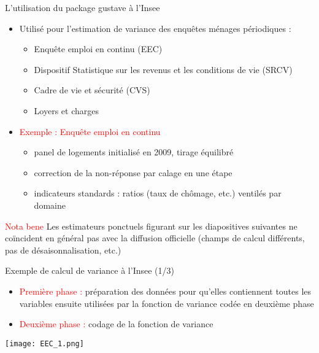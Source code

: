\documentclass[xcolor=dvipsnames]{beamer}
\begin{document}
\begin{frame}{L'utilisation du package gustave à l'Insee}

\begin{itemize}
    \item Utilisé pour l'estimation de variance des enquêtes ménages périodiques : 
    \vspace{0.1 cm}
    \begin{itemize}
        \item Enquête emploi en continu (EEC)
        \item Dispositif Statistique sur les revenus et les conditions de vie (SRCV)
        \item Cadre de vie et sécurité (CVS)
        \item Loyers et charges
    \end{itemize}
    \vspace{0.2 cm}
    \item \textcolor{red}{Exemple : Enquête emploi en continu}
    \vspace{0.1 cm}
    \begin{itemize}
        \item panel de logements initialisé en 2009, tirage équilibré
        \item correction de la non-réponse par calage en une étape
        \item indicateurs standards : ratios (taux de chômage, etc.) ventilés par domaine
    \end{itemize}

\end{itemize}

\vspace{0.2 cm}
\footnotesize{\textcolor{red}{Nota bene} Les estimateurs ponctuels figurant sur les diapositives suivantes ne coïncident en général pas avec la diffusion officielle (champs de calcul différents, pas de désaisonnalisation, etc.)}

\end{frame}

\begin{frame}{Exemple de calcul de variance à l'Insee (1/3)}
    
\begin{itemize}
    \item \textcolor{red}{Première phase :} préparation des données pour qu'elles contiennent toutes les variables ensuite utilisées par la fonction de variance codée en deuxième phase
    \vspace{0.5 cm} 
    \item \textcolor{red}{Deuxième phase :} codage de la fonction de variance
\end{itemize}

\begin{center}
    \texttt{[image: EEC\_1.png]}
\end{center}    

\end{frame}
\end{document}
